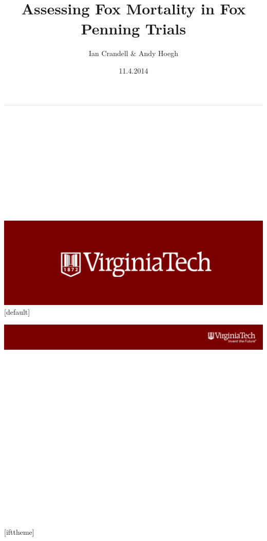\documentclass{beamer}
\title{Assessing Fox Mortality in Fox Penning Trials}
\author{Ian Crandell \& Andy Hoegh}
\institute{
Department of Statistics, Virginia Tech
}
\date{11.4.2014}
\begin{document}
\newcommand\Fontvi{\fontsize{6}{7.2}\selectfont}

 {\includegraphics[width=\paperwidth,height=\paperheight]{frontpage}}
[default]

\begin{frame}
  \titlepage
  \vspace{5cm}
\end{frame}

%
%
 {\includegraphics[width=\paperwidth,height=\paperheight]{slide_small}}
[ifttheme]
\end{document}
